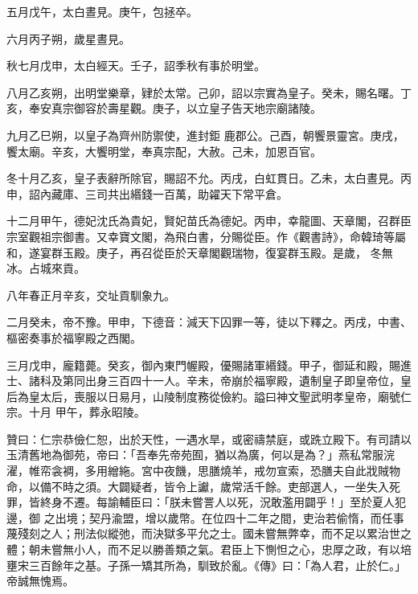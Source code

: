 \begin{pinyinscope}
 五月戊午，太白晝見。庚午，包拯卒。



 六月丙子朔，歲星晝見。



 秋七月戊申，太白經天。壬子，詔季秋有事於明堂。



 八月乙亥朔，出明堂樂章，肄於太常。己卯，詔以宗實為皇子。癸未，賜名曙。丁亥，奉安真宗御容於壽星觀。庚子，以立皇子告天地宗廟諸陵。



 九月乙巳朔，以皇子為齊州防禦使，進封鉅
 鹿郡公。己酉，朝饗景靈宮。庚戌，饗太廟。辛亥，大饗明堂，奉真宗配，大赦。己未，加恩百官。



 冬十月乙亥，皇子表辭所除官，賜詔不允。丙戌，白虹貫日。乙未，太白晝見。丙申，詔內藏庫、三司共出緡錢一百萬，助糴天下常平倉。



 十二月甲午，德妃沈氏為貴妃，賢妃苗氏為德妃。丙申，幸龍圖、天章閣，召群臣宗室觀祖宗御書。又幸寶文閣，為飛白書，分賜從臣。作《觀書詩》，命韓琦等屬和，遂宴群玉殿。庚子，再召從臣於天章閣觀瑞物，復宴群玉殿。是歲，
 冬無冰。占城來貢。



 八年春正月辛亥，交址貢馴象九。



 二月癸未，帝不豫。甲申，下德音：減天下囚罪一等，徒以下釋之。丙戌，中書、樞密奏事於福寧殿之西閣。



 三月戊申，龐籍薨。癸亥，御內東門幄殿，優賜諸軍緡錢。甲子，御延和殿，賜進士、諸科及第同出身三百四十一人。辛未，帝崩於福寧殿，遺制皇子即皇帝位，皇后為皇太后，喪服以日易月，山陵制度務從儉約。謚曰神文聖武明孝皇帝，廟號仁宗。十月
 甲午，葬永昭陵。



 贊曰：仁宗恭儉仁恕，出於天性，一遇水旱，或密禱禁庭，或跣立殿下。有司請以玉清舊地為御苑，帝曰：「吾奉先帝苑囿，猶以為廣，何以是為？」燕私常服浣濯，帷帟衾裯，多用繒絁。宮中夜饑，思膳燒羊，戒勿宣索，恐膳夫自此戕賊物命，以備不時之須。大闢疑者，皆令上讞，歲常活千餘。吏部選人，一坐失入死罪，皆終身不遷。每諭輔臣曰：「朕未嘗詈人以死，況敢濫用闢乎！」至於夏人犯邊，御
 之出境；契丹渝盟，增以歲幣。在位四十二年之間，吏治若偷惰，而任事蔑殘刻之人；刑法似縱弛，而決獄多平允之士。國未嘗無弊幸，而不足以累治世之體；朝未嘗無小人，而不足以勝善類之氣。君臣上下惻怛之心，忠厚之政，有以培壅宋三百餘年之基。子孫一矯其所為，馴致於亂。《傳》曰：「為人君，止於仁。」帝誠無愧焉。



\end{pinyinscope}